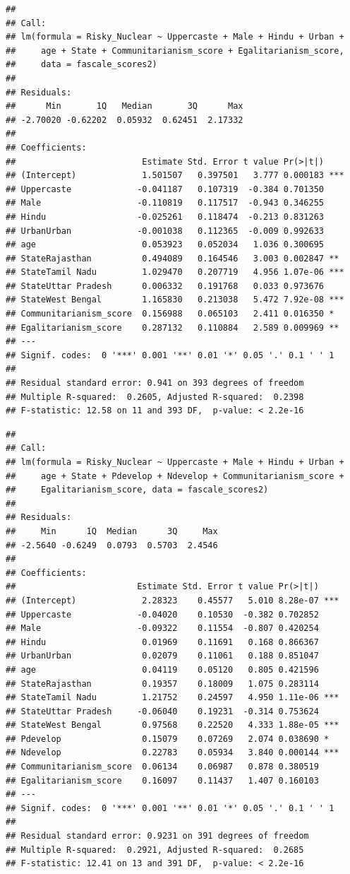 \documentclass[
]{article}
\begin{document}
\begin{verbatim}
## 
## Call:
## lm(formula = Risky_Nuclear ~ Uppercaste + Male + Hindu + Urban + 
##     age + State + Communitarianism_score + Egalitarianism_score, 
##     data = fascale_scores2)
## 
## Residuals:
##      Min       1Q   Median       3Q      Max 
## -2.70020 -0.62202  0.05932  0.62451  2.17332 
## 
## Coefficients:
##                         Estimate Std. Error t value Pr(>|t|)    
## (Intercept)             1.501507   0.397501   3.777 0.000183 ***
## Uppercaste             -0.041187   0.107319  -0.384 0.701350    
## Male                   -0.110819   0.117517  -0.943 0.346255    
## Hindu                  -0.025261   0.118474  -0.213 0.831263    
## UrbanUrban             -0.001038   0.112365  -0.009 0.992633    
## age                     0.053923   0.052034   1.036 0.300695    
## StateRajasthan          0.494089   0.164546   3.003 0.002847 ** 
## StateTamil Nadu         1.029470   0.207719   4.956 1.07e-06 ***
## StateUttar Pradesh      0.006332   0.191768   0.033 0.973676    
## StateWest Bengal        1.165830   0.213038   5.472 7.92e-08 ***
## Communitarianism_score  0.156988   0.065103   2.411 0.016350 *  
## Egalitarianism_score    0.287132   0.110884   2.589 0.009969 ** 
## ---
## Signif. codes:  0 '***' 0.001 '**' 0.01 '*' 0.05 '.' 0.1 ' ' 1
## 
## Residual standard error: 0.941 on 393 degrees of freedom
## Multiple R-squared:  0.2605, Adjusted R-squared:  0.2398 
## F-statistic: 12.58 on 11 and 393 DF,  p-value: < 2.2e-16
\end{verbatim}

\begin{verbatim}
## 
## Call:
## lm(formula = Risky_Nuclear ~ Uppercaste + Male + Hindu + Urban + 
##     age + State + Pdevelop + Ndevelop + Communitarianism_score + 
##     Egalitarianism_score, data = fascale_scores2)
## 
## Residuals:
##     Min      1Q  Median      3Q     Max 
## -2.5640 -0.6249  0.0793  0.5703  2.4546 
## 
## Coefficients:
##                        Estimate Std. Error t value Pr(>|t|)    
## (Intercept)             2.28323    0.45577   5.010 8.28e-07 ***
## Uppercaste             -0.04020    0.10530  -0.382 0.702852    
## Male                   -0.09322    0.11554  -0.807 0.420254    
## Hindu                   0.01969    0.11691   0.168 0.866367    
## UrbanUrban              0.02079    0.11061   0.188 0.851047    
## age                     0.04119    0.05120   0.805 0.421596    
## StateRajasthan          0.19357    0.18009   1.075 0.283114    
## StateTamil Nadu         1.21752    0.24597   4.950 1.11e-06 ***
## StateUttar Pradesh     -0.06040    0.19231  -0.314 0.753624    
## StateWest Bengal        0.97568    0.22520   4.333 1.88e-05 ***
## Pdevelop                0.15079    0.07269   2.074 0.038690 *  
## Ndevelop                0.22783    0.05934   3.840 0.000144 ***
## Communitarianism_score  0.06134    0.06987   0.878 0.380519    
## Egalitarianism_score    0.16097    0.11437   1.407 0.160103    
## ---
## Signif. codes:  0 '***' 0.001 '**' 0.01 '*' 0.05 '.' 0.1 ' ' 1
## 
## Residual standard error: 0.9231 on 391 degrees of freedom
## Multiple R-squared:  0.2921, Adjusted R-squared:  0.2685 
## F-statistic: 12.41 on 13 and 391 DF,  p-value: < 2.2e-16
\end{verbatim}
\end{document}
